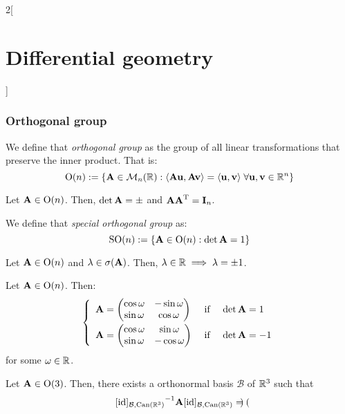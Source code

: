 \documentclass[../../../main.tex]{subfiles}
\begin{document}
\begin{multicols}{2}[\section{Differential geometry}]
  \subsubsection{Orthogonal group}
  \begin{definition}
    We define that \emph{orthogonal group} as the group of all linear transformations that preserve the inner product. That is: $$\text{O}(n):=\{\vf{A}\in\mathcal{M}_n(\RR):\langle\vf{Au},\vf{Av}\rangle=\langle\vf{u},\vf{v}\rangle\;\forall\vf{u},\vf{v}\in\RR^n\}$$
  \end{definition}
  \begin{proposition}
    Let $\vf{A}\in\text{O}(n)$. Then, $\det\vf{A}=\pm$ and $\vf{A}\transpose{\vf{A}}=\vf{I}_n$.
  \end{proposition}
  \begin{definition}
    We define that \emph{special orthogonal group} as: $$\text{SO}(n):=\{\vf{A}\in\text{O}(n):\det\vf{A}=1\}$$
  \end{definition}
  \begin{lemma}
    Let $\vf{A}\in\text{O}(n)$ and $\lambda\in\sigma(\vf{A})$. Then, $\lambda\in\RR\implies\lambda=\pm 1$.
  \end{lemma}
  \begin{proposition}
    Let $\vf{A}\in\text{O}(n)$. Then:
    $$\left\{
      \begin{array}{lll}
        \vspace{0.1cm}
        \vf{A}=\begin{pmatrix}
          \cos\omega & -\sin\omega \\
          \sin\omega & \cos\omega  \\
        \end{pmatrix} &
        \text{ if }                       & \det\vf{A}=1  \\
        \vf{A}=\begin{pmatrix}
          \cos\omega & \sin\omega  \\
          \sin\omega & -\cos\omega \\
        \end{pmatrix} &
        \text{ if }                       & \det\vf{A}=-1
      \end{array}
      \right.
    $$
    for some $\omega\in\RR$.
  \end{proposition}
  \begin{proposition}
    Let $\vf{A}\in\text{O}(3)$. Then, there exists a orthonormal basis $\mathcal{B}$ of $\RR^3$ such that $${[\id]_{\mathcal{B},\text{Can}(\RR^3)}}^{-1}\vf{A}[\id]_{\mathcal{B},\text{Can}(\RR^3)}=\begin{pmatrix}

\end{pmatrix}$$
\end{proposition}
\end{multicols}
\end{document}
